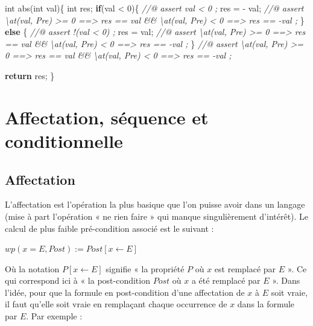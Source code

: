 \documentclass[12pt,francais,]{scrbook}
\newenvironment{Shaded}{}{}
\newcommand{\KeywordTok}[1]{\textcolor[rgb]{0.00,0.44,0.13}{\textbf{{#1}}}}
\newcommand{\DataTypeTok}[1]{\textcolor[rgb]{0.56,0.13,0.00}{{#1}}}
\newcommand{\DecValTok}[1]{\textcolor[rgb]{0.25,0.63,0.44}{{#1}}}
\newcommand{\CommentTok}[1]{\textcolor[rgb]{0.38,0.63,0.69}{\textit{{#1}}}}
\newcommand{\NormalTok}[1]{{#1}}
\begin{document}
\begin{footnotesize}\begin{Shaded}
\begin{Highlighting}[]
\DataTypeTok{int} \NormalTok{abs(}\DataTypeTok{int} \NormalTok{val)\{}
  \DataTypeTok{int} \NormalTok{res;}
  \KeywordTok{if}\NormalTok{(val < }\DecValTok{0}\NormalTok{)\{}
    \CommentTok{//@ assert val < 0 ;}
    \NormalTok{res = - val;}
    \CommentTok{//@ assert \textbackslash{}at(val, Pre) >= 0 ==> res == val &&}
    \CommentTok{           \textbackslash{}at(val, Pre) < 0 ==> res == -val ;}
  \NormalTok{\} }\KeywordTok{else} \NormalTok{\{}
    \CommentTok{//@ assert !(val < 0) ;}
    \NormalTok{res = val;}
    \CommentTok{//@ assert \textbackslash{}at(val, Pre) >= 0 ==> res == val &&}
    \CommentTok{           \textbackslash{}at(val, Pre) < 0 ==> res == -val ;}
  \NormalTok{\}}
  \CommentTok{//@ assert \textbackslash{}at(val, Pre) >= 0 ==> res == val &&}
  \CommentTok{           \textbackslash{}at(val, Pre) < 0 ==> res == -val ;}

  \KeywordTok{return} \NormalTok{res;}
\NormalTok{\}}
\end{Highlighting}
\end{Shaded}\end{footnotesize}

\section{Affectation, séquence et
conditionnelle}\label{affectation-suxe9quence-et-conditionnelle}

\subsection{Affectation}\label{affectation}

L'affectation est l'opération la plus basique que l'on puisse avoir dans
un langage (mise à part l'opération « ne rien faire » qui manque
singulièrement d'intérêt). Le calcul de plus faible pré-condition
associé est le suivant :

\begin{center} \(wp(x = E , Post) := Post[x \leftarrow E]\)
\end{center}

Où la notation \(P[x \leftarrow E]\) signifie « la propriété \(P\) où
\(x\) est remplacé par \(E\) ». Ce qui correspond ici à « la
post-condition \(Post\) où \(x\) a été remplacé par \(E\) ». Dans
l'idée, pour que la formule en post-condition d'une affectation de \(x\)
à \(E\) soit vraie, il faut qu'elle soit vraie en remplaçant chaque
occurrence de \(x\) dans la formule par \(E\). Par exemple :
\end{document}

